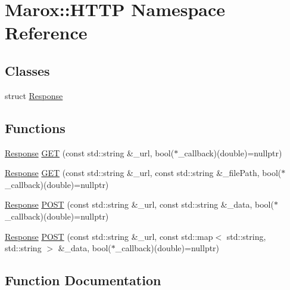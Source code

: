 \hypertarget{namespace_marox_1_1_h_t_t_p}{}\section{Marox\+:\+:H\+T\+T\+P Namespace Reference}
\label{namespace_marox_1_1_h_t_t_p}
\subsection*{Classes}
\begin{DoxyCompactItemize}
\item 
struct \hyperlink{struct_marox_1_1_h_t_t_p_1_1_response}{Response}
\end{DoxyCompactItemize}
\subsection*{Functions}
\begin{DoxyCompactItemize}
\item 
\hyperlink{struct_marox_1_1_h_t_t_p_1_1_response}{Response} \hyperlink{namespace_marox_1_1_h_t_t_p_aadd7590e3d7c51ca561d728b1f8eddea}{G\+E\+T} (const std\+::string \&\+\_\+url, bool($\ast$\+\_\+callback)(double)=nullptr)
\item 
\hyperlink{struct_marox_1_1_h_t_t_p_1_1_response}{Response} \hyperlink{namespace_marox_1_1_h_t_t_p_a21590e24dc7294f4094938c1f47e9de8}{G\+E\+T} (const std\+::string \&\+\_\+url, const std\+::string \&\+\_\+file\+Path, bool($\ast$\+\_\+callback)(double)=nullptr)
\item 
\hyperlink{struct_marox_1_1_h_t_t_p_1_1_response}{Response} \hyperlink{namespace_marox_1_1_h_t_t_p_a4c396dc395762eaa8c1e3ce0b84c779b}{P\+O\+S\+T} (const std\+::string \&\+\_\+url, const std\+::string \&\+\_\+data, bool($\ast$\+\_\+callback)(double)=nullptr)
\item 
\hyperlink{struct_marox_1_1_h_t_t_p_1_1_response}{Response} \hyperlink{namespace_marox_1_1_h_t_t_p_a0054f4cc5e43ad92df8c13daa9476aea}{P\+O\+S\+T} (const std\+::string \&\+\_\+url, const std\+::map$<$ std\+::string, std\+::string $>$ \&\+\_\+data, bool($\ast$\+\_\+callback)(double)=nullptr)
\end{DoxyCompactItemize}


\subsection{Function Documentation}
\hypertarget{namespace_marox_1_1_h_t_t_p_aadd7590e3d7c51ca561d728b1f8eddea}{}
